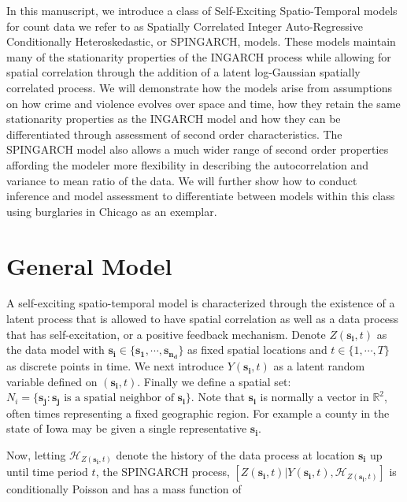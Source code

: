 \documentclass[11pt]{isuthesis}
\begin{document}
In this manuscript, we introduce a class of Self-Exciting Spatio-Temporal models for count data we refer to as Spatially Correlated Integer Auto-Regressive Conditionally Heteroskedastic, or SPINGARCH, models.  These models maintain many of the stationarity properties of the INGARCH process while allowing for spatial correlation through the addition of a latent log-Gaussian spatially correlated process.  We will demonstrate how the models arise from assumptions on how crime and violence evolves over space and time, how they retain the same stationarity properties as the INGARCH model and how they can be differentiated through assessment of second order characteristics.  The SPINGARCH model also allows a much wider range of second order properties affording the modeler more flexibility in describing the autocorrelation and variance to mean ratio of the data.  We will further show how to conduct inference and model assessment to differentiate between models within this class using burglaries in Chicago as an exemplar.


\section{General Model}

A self-exciting spatio-temporal model is characterized through the existence of a latent process that is allowed to have spatial correlation as well as a data process that has self-excitation, or a positive feedback mechanism.  Denote $Z(\boldsymbol{s_i},t)$ as the data model with $\boldsymbol{s_i} \in \{\boldsymbol{s_1},\cdots,\boldsymbol{s_{n_d}}\}$ as fixed spatial locations and $t \in \{1,\cdots,T\}$ as discrete points in time.  We next introduce $Y(\boldsymbol{s_i},t)$ as a latent random variable defined on $(\boldsymbol{s_i},t)$. Finally we define a spatial set: $N_i=\{\boldsymbol{s_j} :\boldsymbol{s_j}\text{ is a spatial neighbor of } \boldsymbol{s_i}\}$.  Note that $\boldsymbol{s_i}$ is normally a vector in $\mathbb{R}^2$, often times representing a fixed geographic region. For example a county in the state of Iowa may be given a single representative $\boldsymbol{s_i}$.  

Now, letting $\mathcal{H}_{Z(\boldsymbol{s_i},t)}$ denote the history of the data process at location $\boldsymbol{s_i}$ up until time period $t$,  the SPINGARCH process, $\left[ Z(\boldsymbol{s_i},t)|Y(\boldsymbol{s_i},t),\mathcal{H}_{Z(\boldsymbol{s_i},t)}\right] $ is conditionally Poisson and has a mass function of 
\end{document}
